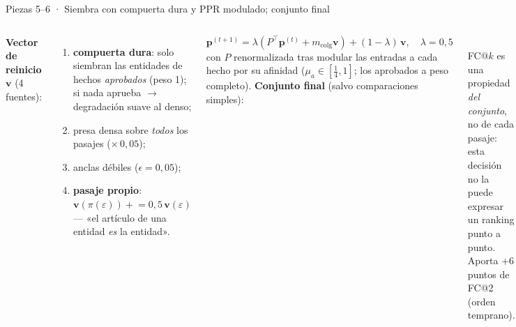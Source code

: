 \documentclass[aspectratio=169,10pt]{beamer}
\begin{document}
\begin{frame}{Piezas 5--6 · Siembra con compuerta dura y PPR modulado; conjunto final}
\begin{columns}[T]
\textbf{Vector de reinicio} $\mathbf v$ (4 fuentes):
\begin{enumerate}\footnotesize
\item \textbf{compuerta dura}: solo siembran las entidades de hechos
  \emph{aprobados} (peso 1); si nada aprueba $\to$ degradación suave al denso;
\item presa densa sobre \emph{todos} los pasajes ($\times\,0{,}05$);
\item anclas débiles ($\epsilon=0{,}05$);
\item \textbf{pasaje propio}: $\mathbf v(\pi(\varepsilon)) \mathrel{+}= 0{,}5\,\mathbf v(\varepsilon)$
  --- «el artículo de una entidad \emph{es} la entidad».
\end{enumerate}
\[
\mathbf p^{(t+1)}=\lambda\!\left(P^{\top}\mathbf p^{(t)}+m_{\text{colg}}\mathbf v\right)+(1-\lambda)\,\mathbf v,
\quad \lambda=0{,}5
\]
con $P$ renormalizada tras modular las entradas a cada hecho por su afinidad
($\mu_a\in[\tfrac14,1]$; los aprobados a peso completo).
\textbf{Conjunto final} (salvo comparaciones simples):\\[1mm]
\\[1mm]
\footnotesize FC@$k$ es una propiedad \emph{del conjunto}, no de cada pasaje:
esta decisión no la puede expresar un ranking punto a punto.
Aporta $+6$ puntos de FC@2 (orden temprano).
\end{columns}
\end{frame}
\end{document}

